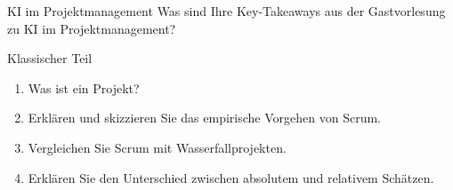\documentclass{article}
\begin{document}
\begin{exercise}{KI im Projektmanagement}
  Was sind Ihre Key-Takeaways aus der Gastvorlesung zu KI im Projektmanagement?

  \begin{solution}
  \end{solution}
\end{exercise}


\begin{exercise}{Klassischer Teil}
  \begin{enumerate}
    \item Was ist ein Projekt?
    \item Erklären und skizzieren Sie das empirische Vorgehen von Scrum.
    \item Vergleichen Sie Scrum mit Wasserfallprojekten.
    \item Erklären Sie den Unterschied zwischen absolutem und relativem Schätzen.
  \end{enumerate}


\end{exercise}
\end{document}

